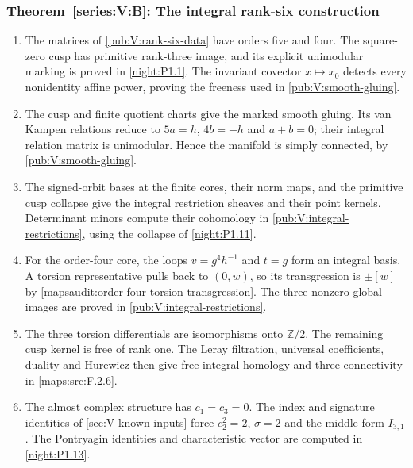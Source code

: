 \subsubsection*{Theorem~\ref{series:V:B}: The integral rank-six construction}
\begin{enumerate}[label=\arabic*.,leftmargin=*]
\item\hypertarget{step-V-B-1}{} The matrices of \cref{pub:V:rank-six-data} have orders five and four. The square-zero cusp has primitive rank-three image, and its explicit unimodular marking is proved in \cref{night:P1.1}. The invariant covector $x\mapsto x_0$ detects every nonidentity affine power, proving the freeness used in \cref{pub:V:smooth-gluing}.

\item\hypertarget{step-V-B-2}{} The cusp and finite quotient charts give the marked smooth gluing. Its van Kampen relations reduce to $5a=h$, $4b=-h$ and $a+b=0$; their integral relation matrix is unimodular. Hence the manifold is simply connected, by \cref{pub:V:smooth-gluing}.

\item\hypertarget{step-V-B-3}{} The signed-orbit bases at the finite cores, their norm maps, and the primitive cusp collapse give the integral restriction sheaves and their point kernels. Determinant minors compute their cohomology in \cref{pub:V:integral-restrictions}, using the collapse of \cref{night:P1.11}.

\item\hypertarget{step-V-B-4}{} For the order-four core, the loops $v=g^4h^{-1}$ and $t=g$ form an integral basis. A torsion representative pulls back to $(0,w)$, so its transgression is $\pm[w]$ by \cref{mapsaudit:order-four-torsion-transgression}. The three nonzero global images are proved in \cref{pub:V:integral-restrictions}.

\item\hypertarget{step-V-B-5}{} The three torsion differentials are isomorphisms onto $\mathbb Z/2$. The remaining cusp kernel is free of rank one. The Leray filtration, universal coefficients, duality and Hurewicz then give free integral homology and three-connectivity in \cref{maps:src:F.2.6}.

\item\hypertarget{step-V-B-6}{} The almost complex structure has $c_1=c_3=0$. The index and signature identities of \cref{sec:V-known-inputs} force $c_2^2=2$, $\sigma=2$ and the middle form $I_{3,1}$. The Pontryagin identities and characteristic vector are computed in \cref{night:P1.13}.

\end{enumerate}

